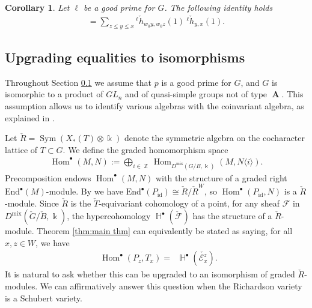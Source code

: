 \documentclass[11pt]{article}
\DeclareMathOperator{\mix}{mix}
\DeclareMathOperator{\Z}{\mathbb{Z}}
\DeclareMathOperator{\bH}{\mathbb{H}}
\DeclareMathOperator{\tA}{\textbf{A}}
\DeclareMathOperator{\Hom}{Hom}
\DeclareMathOperator{\grrk}{rk^{\bullet}}
\DeclareMathOperator{\id}{id}
\DeclareMathOperator{\Sym}{Sym}
\newtheorem{cor}[thm]{Corollary}
\theoremstyle{remark}
\theoremstyle{definition}
\begin{document}
	\begin{cor}
		Let $\ell$ be a good prime for $G$. 
		The following identity holds
		\begin{align*}
			[\overline{T}_x : \overline{L}_z]
			=
			\sum_{z \leq y \leq x} {}^{\ell} \check{h}_{w_0 y, w_0 z}(1) ~{}^{\ell} \check{h}_{y,x}(1).
		\end{align*}
	\end{cor} 

\subsection{Upgrading equalities to isomorphisms}
\label{Ssec: Isomorphisms}

    Throughout Section \ref{Ssec: Isomorphisms} we assume that $p$ is a good prime for $G$, and $G$ is isomorphic to a product of $GL_n$ and of quasi-simple groups not of type $\tA$.
    This assumption allows us to identify various algebras with the coinvariant algebra, as explained in \cite[\S4.1]{AR16a}. 
    \\
    \par 
    Let $\check{R} = \Sym(X_*(T) \otimes \Bbbk)$ denote the symmetric algebra on the cocharacter lattice of $T \subset G$. 
    We define the graded homomorphism space
    \begin{align*}
        \Hom^{\bullet} (M,N) 
        := 
        \bigoplus_{i \in \Z}
        \Hom_{D^{\mix}(G/B,\Bbbk)} (M, N\langle i \rangle).
    \end{align*}
    Precomposition endows $\Hom^{\bullet} (M,N)$ with the structure of a graded right $\text{End}^{\bullet}(M)$-module. 
    By \cite[\S4.1]{AR16a} we have $\text{End}^{\bullet}(P_{\id}) \cong \check{R}/ \check{R}^{W}$, so $\Hom^{\bullet} (P_{\id},N)$ is a $\check{R}$-module.
    Since $\check{R}$ is the $\check{T}$-equivariant cohomology of a point, for any sheaf $\mathscr{F}$ in $D^{\mix}(\check{G}/\check{B}, \Bbbk)$, the hypercohomology $\bH^{\bullet}(\check{\mathscr{F}})$ has the structure of a $\check{R}$-module. 
    Theorem \ref{thm:main thm} can equivalently be stated as saying, for all $x,z \in W$, we have
    \begin{align*}
         \grrk \Hom^{\bullet} (P_z , T_x )
         =
         \grrk \bH^{\bullet}(\check{\mathscr{E}_x^z}). 
    \end{align*}
    It is natural to ask whether this can be upgraded to an isomorphism of graded $\check{R}$-modules.
    We can affirmatively answer this question when the Richardson variety is a Schubert variety. 
\end{document}
